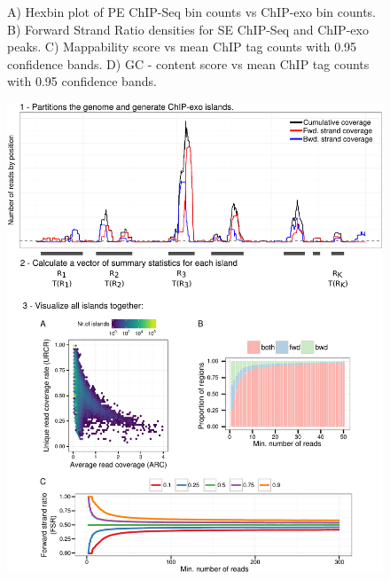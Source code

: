 \documentclass{bmcart}\usepackage[]{graphicx}\usepackage[]{color}
\begin{document}
\begin{figure}[h!]
  \caption{ A) Hexbin plot of PE ChIP-Seq bin counts vs ChIP-exo bin
    counts. B) Forward Strand Ratio densities for SE ChIP-Seq and
    ChIP-exo peaks. C) Mappability score vs mean ChIP tag counts with
    0.95 confidence bands. D) GC - content score vs mean ChIP tag
    counts with 0.95 confidence bands.}
  \label{fig:comp}
\end{figure}


\newpage

\begin{figure}[h!]
  \centering
  \includegraphics[width = \textwidth]{../figs/for_paper/coverage_diagram3.pdf}

\end{figure}
\end{document}
